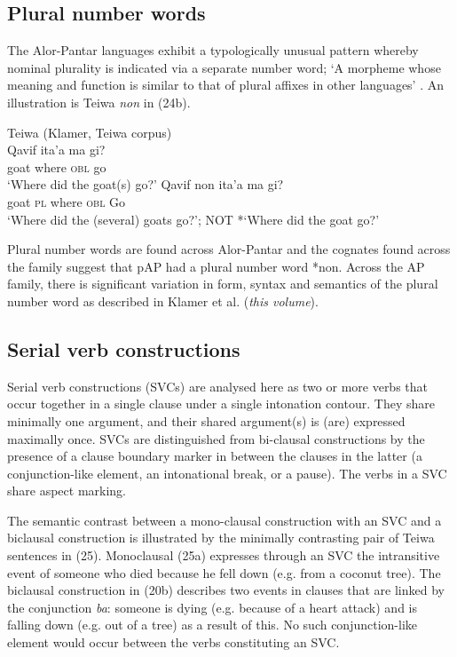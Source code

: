 \subsection{Plural number words}
The Alor-Pantar languages exhibit a typologically unusual pattern \citep{Dryer2005} whereby nominal plurality is indicated via a separate number word; `A morpheme whose meaning and function is similar to that of plural affixes in other languages' \citep{Dryer1989}. An illustration is Teiwa \textit{non} in (24b).



\ea%
\label{ex:24}
 Teiwa (Klamer, Teiwa corpus)   \\
\ea
\gll Qavif  ita'a   ma  gi?  \\
goat  where  \textsc{obl} go     \\
\glt `Where did the goat(s) go?'
\ex
\gll Qavif  non  ita'a   ma  gi? \\
  goat  \textsc{pl} where  \textsc{obl} Go  \\
\glt `Where did the (several) goats go?';  NOT *`Where did the goat go?'
\z
\z


Plural number words are found across Alor-Pantar and the cognates found across the family suggest that pAP had a plural number word *non. Across the AP family, there is significant variation in form, syntax and semantics of the plural number word as described in Klamer et al. (\textit{this volume}).

\subsection{Serial verb constructions}
Serial verb constructions (SVCs) are analysed here as two or more verbs that occur together in a single clause under a single intonation contour. They share minimally one argument, and their shared argument(s) is (are) expressed maximally once. SVCs are distinguished from bi-clausal constructions by the presence of a clause boundary marker in between the clauses in the latter (a conjunction-like element, an intonational break, or a pause). The verbs in a SVC share aspect marking.

The semantic contrast between a mono-clausal construction with an SVC and a biclausal construction is illustrated by the minimally contrasting pair of Teiwa sentences in (25). Monoclausal (25a) expresses through an SVC the intransitive event of someone who died because he fell down (e.g. from a coconut tree). The biclausal construction in (20b) describes two events in clauses that are linked by the conjunction \textit{ba}: someone is dying (e.g. because of a heart attack) and is falling down (e.g. out of a tree) as a result of this. No such conjunction-like element would occur between the verbs constituting an SVC.



